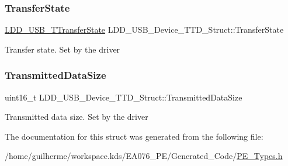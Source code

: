 \subsubsection{\texorpdfstring{Transfer\+State}{TransferState}}
{\footnotesize\ttfamily \hyperlink{group___p_e___types__module_gacf5f7e704d87aba90dc002ed7c0d28b4}{L\+D\+D\+\_\+\+U\+S\+B\+\_\+\+T\+Transfer\+State} L\+D\+D\+\_\+\+U\+S\+B\+\_\+\+Device\+\_\+\+T\+T\+D\+\_\+\+Struct\+::\+Transfer\+State}

Transfer state. Set by the driver \mbox{\label{struct_l_d_d___u_s_b___device___t_t_d___struct_aeffbf1300fce5fc9ebf98f5760a96d38}} 
\subsubsection{\texorpdfstring{Transmitted\+Data\+Size}{TransmittedDataSize}}
{\footnotesize\ttfamily uint16\+\_\+t L\+D\+D\+\_\+\+U\+S\+B\+\_\+\+Device\+\_\+\+T\+T\+D\+\_\+\+Struct\+::\+Transmitted\+Data\+Size}

Transmitted data size. Set by the driver 

The documentation for this struct was generated from the following file\+:\begin{DoxyCompactItemize}
\item 
/home/guilherme/workspace.\+kds/\+E\+A076\+\_\+\+P\+E/\+Generated\+\_\+\+Code/\hyperlink{_p_e___types_8h}{P\+E\+\_\+\+Types.\+h}\end{DoxyCompactItemize}
